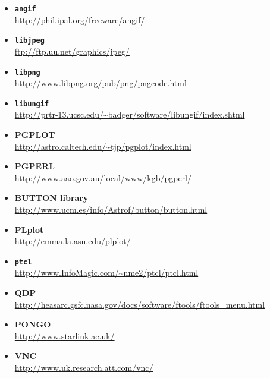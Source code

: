 \documentclass[twoside,11pt]{starlink}
\begin{document}
\begin{itemize}
\item {\bf\label{sc15_available_libangif}\texttt{angif}}\\
\url{http://phil.ipal.org/freeware/angif/}

\item {\bf\label{sc15_available_libjpeg}\texttt{libjpeg}}\\
\url{ftp://ftp.uu.net/graphics/jpeg/}

\item {\bf\label{sc15_available_libpng}\texttt{libpng}}\\
\url{http://www.libpng.org/pub/png/pngcode.html}

 \item {\bf\label{sc15_available_libungif}\texttt{libungif}}\\
\url{http://prtr-13.ucsc.edu/~badger/software/libungif/index.shtml}

\item {\bf\label{sc15_available_pgplot}PGPLOT}\\
\url{http://astro.caltech.edu/~tjp/pgplot/index.html}

\item {\bf\label{sc15_available_pgperl}PGPERL}\\
\url{http://www.aao.gov.au/local/www/kgb/pgperl/}

\item {\bf\label{sc15_available_button}BUTTON library}\\
\url{http://www.ucm.es/info/Astrof/button/button.html}

\item {\bf\label{sc15_available_plplot}PLplot}\\
\url{http://emma.la.asu.edu/plplot/}

\item {\bf\label{sc15_available_ptcl}\texttt{ptcl}}\\
\url{http://www.InfoMagic.com/~nme2/ptcl/ptcl.html}

\item {\bf\label{sc15_available_qdp}QDP}\\
\url{http://heasarc.gsfc.nasa.gov/docs/software/ftools/ftools\_menu.html}

\item {\bf\label{sc15_available_pongo}PONGO}\\
\url{http://www.starlink.ac.uk/}

\item {\bf\label{sc15_available_vnc}VNC}\\
\url{http://www.uk.research.att.com/vnc/}


\end{itemize}
\end{document}
